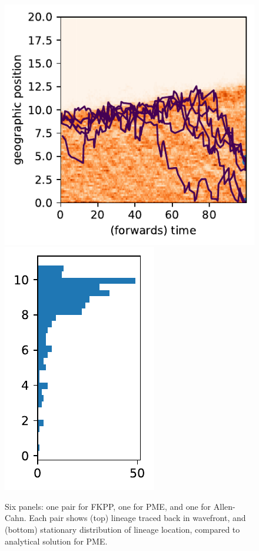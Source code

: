 \documentclass[12pt]{article}
\begin{document}
\begin{figure}
\begin{center}
        \includegraphics{figures/ex3_allen-cahn/allen-cahn_123.lineages}
        \includegraphics{figures/ex3_allen-cahn/allen-cahn_123.lineagehist}
    \end{center}
    \caption{
        Six panels: one pair for FKPP, one for PME, and one for Allen-Cahn.
        Each pair shows (top) lineage traced back in wavefront,
        and (bottom) stationary distribution of lineage location,
        compared to analytical solution for PME.
        \label{fig:pme_vs_fkpp}
    }
\end{figure}
\end{document}
